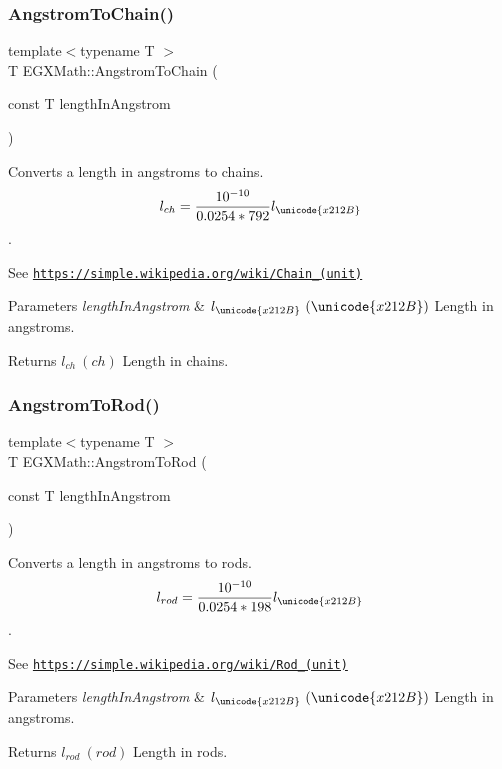 \subsubsection{\texorpdfstring{Angstrom\+To\+Chain()}{AngstromToChain()}}
{\footnotesize\ttfamily template$<$typename T $>$ \\
T E\+G\+X\+Math\+::\+Angstrom\+To\+Chain (\begin{DoxyParamCaption}\item[{const T}]{length\+In\+Angstrom }\end{DoxyParamCaption})}



Converts a length in angstroms to chains. \[ l_{ch}= \frac{10^{-10}}{0.0254 * 792} l_{\unicode{x212B}} \]. 

See \href{https://simple.wikipedia.org/wiki/Chain_(unit)}{\tt https\+://simple.\+wikipedia.\+org/wiki/\+Chain\+\_\+(unit)} 
\begin{DoxyParams}{Parameters}
{\em length\+In\+Angstrom} & $ l_{\unicode{x212B}}\ (\unicode{x212B})$ Length in angstroms. \\
\hline
\end{DoxyParams}
\begin{DoxyReturn}{Returns}
$ l_{ch}\ (ch)$ Length in chains. 
\end{DoxyReturn}
\mbox{\label{group___e_g_x_math-_conversions-_length_conversions-_non-_s_i-_angstrom-_surveyors_gaf6080801cd8901dc21f80eed4ec3e421}} 
\subsubsection{\texorpdfstring{Angstrom\+To\+Rod()}{AngstromToRod()}}
{\footnotesize\ttfamily template$<$typename T $>$ \\
T E\+G\+X\+Math\+::\+Angstrom\+To\+Rod (\begin{DoxyParamCaption}\item[{const T}]{length\+In\+Angstrom }\end{DoxyParamCaption})}



Converts a length in angstroms to rods. \[ l_{rod}= \frac{10^{-10}}{0.0254 * 198} l_{\unicode{x212B}} \]. 

See \href{https://simple.wikipedia.org/wiki/Rod_(unit)}{\tt https\+://simple.\+wikipedia.\+org/wiki/\+Rod\+\_\+(unit)} 
\begin{DoxyParams}{Parameters}
{\em length\+In\+Angstrom} & $ l_{\unicode{x212B}}\ (\unicode{x212B})$ Length in angstroms. \\
\hline
\end{DoxyParams}
\begin{DoxyReturn}{Returns}
$ l_{rod}\ (rod)$ Length in rods. 
\end{DoxyReturn}
